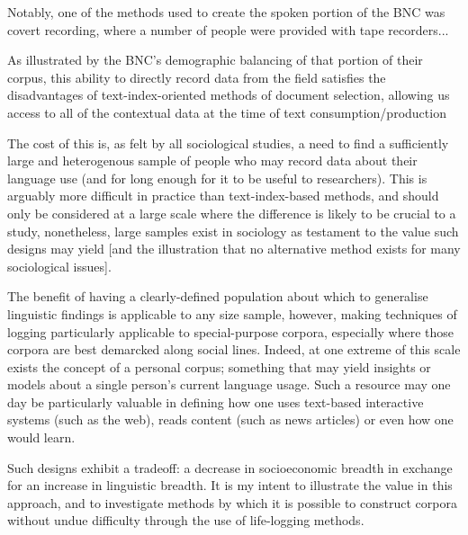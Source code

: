 Notably, one of the methods used to create the spoken portion of the BNC was covert recording, where a number of people were provided with tape recorders...

As illustrated by the BNC's demographic balancing of that portion of their corpus, this ability to directly record data from the field satisfies the disadvantages of text-index-oriented methods of document selection, allowing us access to all of the contextual data at the time of text consumption/production 

The cost of this is, as felt by all sociological studies, a need to find a sufficiently large and heterogenous sample of people who may record data about their language use (and for long enough for it to be useful to researchers).  This is arguably more difficult in practice than text-index-based methods, and should only be considered at a large scale where the difference is likely to be crucial to a study, nonetheless, large samples exist in sociology as testament to the value such designs may yield [and the illustration that no alternative method exists for many sociological issues].

The benefit of having a clearly-defined population about which to generalise linguistic findings is applicable to any size sample, however, making techniques of logging particularly applicable to special-purpose corpora, especially where those corpora are best demarcked along social lines.  Indeed, at one extreme of this scale exists the concept of a personal corpus; something that may yield insights or models about a single person's current language usage.  Such a resource may one day be particularly valuable in defining how one uses text-based interactive systems (such as the web), reads content (such as news articles) or even how one would learn.

Such designs exhibit a tradeoff: a decrease in socioeconomic breadth in exchange for an increase in linguistic breadth.  It is my intent to illustrate the value in this approach, and to investigate methods by which it is possible to construct corpora without undue difficulty through the use of life-logging methods.





